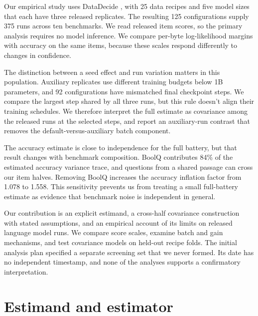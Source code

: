 \documentclass{article}
\begin{document}
Our empirical study uses DataDecide \citep{magnusson2025}, with 25 data recipes and five model sizes that each have three released replicates. The resulting 125 configurations supply 375 runs across ten benchmarks. We read released item scores, so the primary analysis requires no model inference. We compare per-byte log-likelihood margins with accuracy on the same items, because these scales respond differently to changes in confidence.

The distinction between a seed effect and run variation matters in this population. Auxiliary replicates use different training budgets below 1B parameters, and 92 configurations have mismatched final checkpoint steps. We compare the largest step shared by all three runs, but this rule doesn't align their training schedules. We therefore interpret the full estimate as covariance among the released runs at the selected steps, and report an auxiliary-run contrast that removes the default-versus-auxiliary batch component.

The accuracy estimate is close to independence for the full battery, but that result changes with benchmark composition. BoolQ contributes 84\% of the estimated accuracy variance trace, and questions from a shared passage can cross our item halves. Removing BoolQ increases the accuracy inflation factor from 1.078 to 1.558. This sensitivity prevents us from treating a small full-battery estimate as evidence that benchmark noise is independent in general.

Our contribution is an explicit estimand, a cross-half covariance construction with stated assumptions, and an empirical account of its limits on released language model runs. We compare score scales, examine batch and gain mechanisms, and test covariance models on held-out recipe folds. The initial analysis plan specified a separate screening set that we never formed. Its date has no independent timestamp, and none of the analyses supports a confirmatory interpretation.

\section{Estimand and estimator}
\label{sec:estimator}
\end{document}
